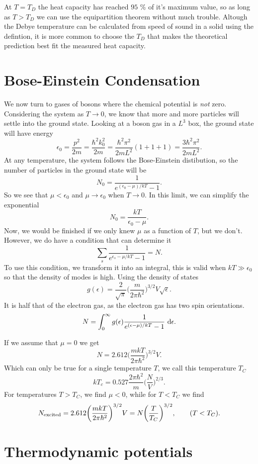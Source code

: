\documentclass[a4paper, 11pt, notitlepage, english]{article}
\renewcommand{\d}{{\rm d}}
\newcommand{\eps}{\epsilon}
\begin{document}
At $T = T_D$ the heat capacity has reached $95$ \% of it's maximum value, so as long as $T > T_D$ we can use the equipartition theorem without much trouble. Altough the Debye temperature can be calculated from speed of sound in a solid using the defintion, it is more common to choose the $T_D$ that makes the theoretical prediction best fit the measured heat capacity.

\clearpage

\section*{Bose-Einstein Condensation}

We now turn to gases of bosons where the chemical potential is \emph{not} zero. Considering the system as $T \to 0$, we know that more and more particles will settle into the ground state. Looking at a boson gas in a $L^3$ box, the ground state will have energy
$$\eps_0 = \frac{p^2}{2m} = \frac{\hbar^2k_0^2}{2m} = \frac{\hbar^2 \pi^2}{2mL^2}(1+1+1) = \frac{3\hbar^2 \pi^2}{2mL^2}.$$
At any temperature, the system follows the Bose-Einstein distibution, so the number of particles in the ground state will be
$$N_0 = \frac{1}{e^{(\eps_0 - \mu)/kT} - 1}.$$
So we see that $\mu < \eps_0$ and $\mu \to \eps_0$ when $T\to 0$. In this limit, we can simplify the exponential
$$N_0 = \frac{kT}{\eps_0 - \mu}.$$
Now, we would be finished if we only knew $\mu$ as a function of $T$, but we don't. However, we do have a condition that can determine it
$$\sum_s \frac{1}{e^{\eps_s -\mu/kT} - 1} = N.$$
To use this condition, we transform it into an integral, this is valid when $kT \gg \eps_0$ so that the density of modes is high. Using the density of states
$$g(\eps) = \frac{2}{\sqrt{\pi}}\bigg(\frac{m}{2\pi\hbar^2}\bigg)^{3/2} V \sqrt{\eps}.$$
It is half that of the electron gas, as the electron gas has two spin orientations.
$$N = \int_0^\infty g(\eps) \frac{1}{e^{(\eps-\mu)/kT}-1}\ \d \eps.$$

If we assume that $\mu = 0$ we get
$$N = 2.612\bigg(\frac{m kT}{2\pi \hbar^2}\bigg)^{3/2}V.$$
Which can only be true for a single temperature $T$, we call this temperature $T_C$
$$kT_c = 0.527 \frac{2\pi \hbar^2}{m}\bigg(\frac{N}{V}\bigg)^{2/3}.$$
For temperatures $T>T_C$, we find $\mu < 0$, while for $T<T_C$ we find
$$N_{\rm excited} = 2.612 \bigg(\frac{mkT}{2\pi\hbar^2}\bigg)^{3/2}V = N\bigg(\frac{T}{T_C}\bigg)^{3/2}, \qquad (T < T_C).$$

\clearpage

\section*{Thermodynamic potentials}
\end{document}
